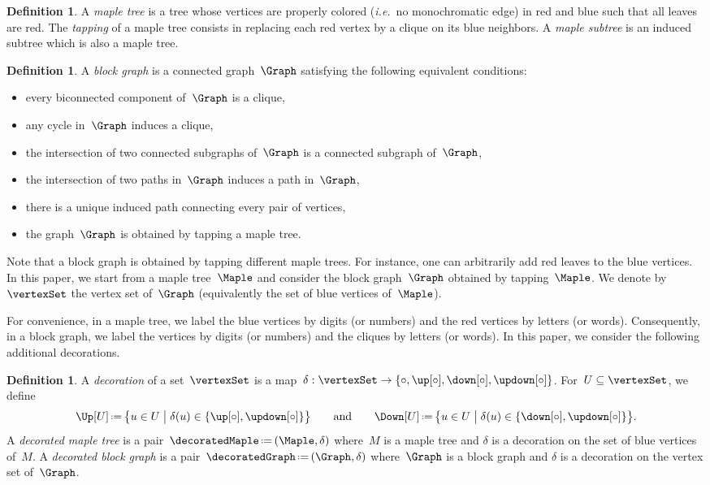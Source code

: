 \documentclass{amsart}
\theoremstyle{definition}
\newtheorem{definition}[theorem]{Definition}
\newcommand{\bigset}[2]{\big\{ #1 \;\big|\; #2 \big\}} %
\newcommand{\eqdef}{\mbox{\,\raisebox{0.2ex}{\scriptsize\ensuremath{\mathrm:}}\ensuremath{=}\,}} %
\newcommand{\ie}{\textit{i.e.}~} %
\newcommand{\darkblue}{\color{darkblue}} %
\newcommand{\defn}[1]{\textsl{\darkblue #1}} %
\newcommand{\vincent}[1]{\todo[color=blue!30]{#1 \\ \hfill --- V.}}
\newcommand{\decoration}{\delta}
\begin{document}
\begin{definition}
  A \defn{maple tree} is a tree whose vertices are properly colored (\ie no monochromatic edge) in red and blue such that all leaves are red.
  \vincent{should blue be gray?}
  The \defn{tapping} of a maple tree consists in replacing each red vertex by a clique on its blue neighbors.
  A \defn{maple subtree} is an induced subtree which is also a maple tree.
\end{definition}

\begin{definition}
  \label{def:blockgraph}
  A \defn{block graph} is a connected graph~$\Graph$ satisfying the following equivalent conditions:
  \begin{itemize}
    \item every biconnected component of~$\Graph$ is a clique,
    \item any cycle in~$\Graph$ induces a clique,
    \item the intersection of two connected subgraphs of~$\Graph$ is a connected subgraph of~$\Graph$,
    \item the intersection of two paths in~$\Graph$ induces a path in~$\Graph$,
    \item there is a unique induced path connecting every pair of vertices,
    \item the graph~$\Graph$ is obtained by tapping a maple tree.
  \end{itemize}
\end{definition}

Note that a block graph is obtained by tapping different maple trees. For instance, one can arbitrarily add red leaves to the blue vertices.
In this paper, we start from a maple tree~$\Maple$ and consider the block graph~$\Graph$ obtained by tapping~$\Maple$.
We denote by~$\vertexSet$ the vertex set of~$\Graph$ (equivalently the set of blue vertices of~$\Maple$).

For convenience, in a maple tree, we label the blue vertices by digits (or numbers) and the red vertices by letters (or words).
Consequently, in a block graph, we label the vertices by digits (or numbers) and the cliques by letters (or words).
In this paper, we consider the following additional decorations.

\begin{definition}
  A \defn{decoration} of a set~$\vertexSet$ is a map~$\decoration : \vertexSet \to \{\circ, \up[\circ], \down[\circ], \updown[\circ]\}$.
  For~$U \subseteq \vertexSet$, we define
  \[
    \Up[U] \eqdef \bigset{u \in U}{\decoration(u) \in \{\up[\circ], \updown[\circ]\}}
    \qquad\text{and}\qquad
    \Down[U] \eqdef \bigset{u \in U}{\decoration(u) \in \{\down[\circ], \updown[\circ]\}}.
  \]
  A \defn{decorated maple tree} is a pair~$\decoratedMaple \eqdef (\Maple, \decoration)$ where~$M$ is a maple tree and $\decoration$ is a decoration on the set of blue vertices of~$M$.
  A \defn{decorated block graph} is a pair~$\decoratedGraph \eqdef (\Graph, \decoration)$ where~$\Graph$ is a block graph and $\decoration$ is a decoration on the vertex set of~$\Graph$.
\end{definition}
\end{document}
